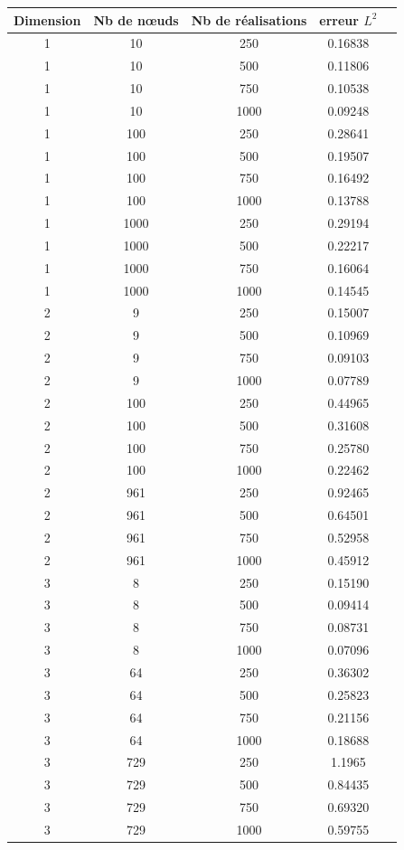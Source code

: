 \begin{table}[htbp]
\centering
\begin{tabular}{|c |c |c |c |c |}
\hline
Dimension & Nb de n\oe uds & Nb de réalisations  & erreur $L^2$ \\
\hline
1 & 10 & 250 & 0.16838   \\
\hline
1 & 10 & 500 &  0.11806   \\
\hline
1 & 10 & 750 &  0.10538   \\
\hline
1 & 10 & 1000 & 0.09248  \\
\hline
\hline
1 & 100 & 250 & 0.28641    \\
\hline
1 & 100 & 500 & 0.19507 \\
\hline
1 & 100 & 750 & 0.16492    \\
\hline
1 & 100 & 1000 & 0.13788    \\
\hline
\hline
1 & 1000 & 250 & 0.29194    \\
\hline
1 & 1000 & 500 & 0.22217    \\
\hline
1 & 1000 & 750 & 0.16064   \\
\hline
1 & 1000 & 1000 & 0.14545    \\
\hline
\hline
2 & 9 & 250 & 0.15007   \\
\hline
2 & 9 & 500 & 0.10969   \\
\hline
2 & 9 & 750 & 0.09103   \\
\hline
2 & 9 & 1000 & 0.07789  \\
\hline
\hline
2 & 100 & 250 & 0.44965   \\
\hline
2 & 100 & 500 & 0.31608   \\
\hline
2 & 100 & 750 & 0.25780    \\
\hline
2 & 100 & 1000 & 0.22462  \\
\hline
\hline
2 & 961 & 250 &  0.92465  \\
\hline
2 & 961 & 500 &  0.64501    \\
\hline
2 & 961 & 750 & 0.52958   \\
\hline
2 & 961 & 1000 & 0.45912    \\
\hline
\hline
3 & 8 & 250 & 0.15190  \\
\hline
3 & 8 & 500 & 0.09414   \\
\hline
3 & 8 & 750 & 0.08731    \\
\hline
3 & 8 & 1000 & 0.07096   \\
\hline
\hline
3 & 64 & 250 & 0.36302   \\
\hline
3 & 64 & 500 & 0.25823   \\
\hline
3 & 64 & 750 & 0.21156    \\
\hline
3 & 64 & 1000 & 0.18688    \\
\hline
\hline
3 & 729 & 250 & 1.1965   \\
\hline
3 & 729 & 500 & 0.84435   \\
\hline
3 & 729 & 750 & 0.69320   \\
\hline
3 & 729 & 1000 & 0.59755  \\
\hline
\end{tabular}
\end{table}

